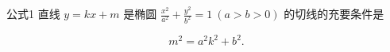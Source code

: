 \documentclass{article}
\begin{document}
公式1 直线 \( y = kx + m \) 是椭圆 \(\frac{x^2}{a^2} + \frac{y^2}{b^2} = 1 \ (a > b > 0)\) 的切线的充要条件是

\[
m^2=a^2k^2 + b^2.
\]
\end{document}
